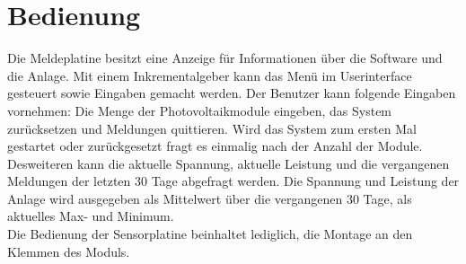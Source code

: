 %
%
%
\section{Bedienung}
Die Meldeplatine besitzt eine Anzeige für Informationen über die Software und die Anlage. Mit einem Inkrementalgeber kann das Menü im Userinterface gesteuert sowie Eingaben gemacht werden. Der Benutzer kann folgende Eingaben vornehmen: Die Menge der Photovoltaikmodule eingeben, das System zurücksetzen und Meldungen quittieren. Wird das System zum ersten Mal gestartet oder zurückgesetzt fragt es einmalig nach der Anzahl der Module.\\
Desweiteren kann die aktuelle Spannung, aktuelle Leistung und die vergangenen Meldungen der letzten 30 Tage abgefragt werden. Die Spannung und Leistung der Anlage wird ausgegeben als Mittelwert über die vergangenen 30 Tage, als aktuelles Max- und Minimum.\\
Die Bedienung der Sensorplatine beinhaltet lediglich, die Montage an den Klemmen des Moduls.
%